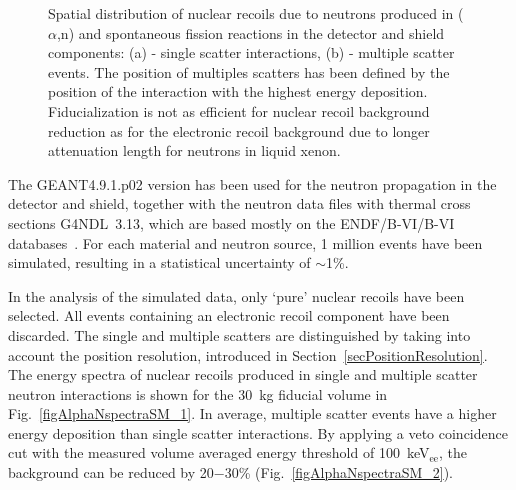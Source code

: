 \begin{figure}[!b]
\centering
{}
\caption[Spatial distribution of nuclear recoils due to neutrons produced in ($\alpha$,n) and spontaneous fission reactions in the detector and shield components]{Spatial distribution of nuclear recoils due to neutrons produced in ($\alpha$,n) and spontaneous fission reactions in the detector and shield components: (a) - single scatter interactions, (b) - multiple scatter events. The position of multiples scatters has been defined by the position of the interaction with the highest energy deposition. Fiducialization is not as efficient for nuclear recoil background reduction as for the electronic recoil background due to longer attenuation length for neutrons in liquid xenon.}
\label{figAlphaNaz}
\end{figure}

The GEANT4.9.1.p02 version has been used for the neutron propagation in the detector and shield, together with the neutron data files with thermal cross sections G4NDL~3.13, which are based mostly on the ENDF/B-VI/B-VI databases~\cite{G4NDL}. For each material and neutron source, 1 million events have been simulated, resulting in a statistical uncertainty of $\sim$1\%.

In the analysis of the simulated data, only `pure' nuclear recoils have been selected. All events containing an electronic recoil component have been discarded. The single and multiple scatters are distinguished by taking into account the position resolution, introduced in Section~\ref{secPositionResolution}. The energy spectra of nuclear recoils produced in single and multiple scatter neutron interactions is shown for the 30~kg fiducial volume in Fig.~\ref{figAlphaNspectraSM_1}. In average, multiple scatter events have a higher energy deposition than single scatter interactions. By applying a veto coincidence cut with the measured volume averaged energy threshold of 100~keV$_{\mathrm{ee}}$, the background can be reduced by 20$-$30\% (Fig.~\ref{figAlphaNspectraSM_2}).

